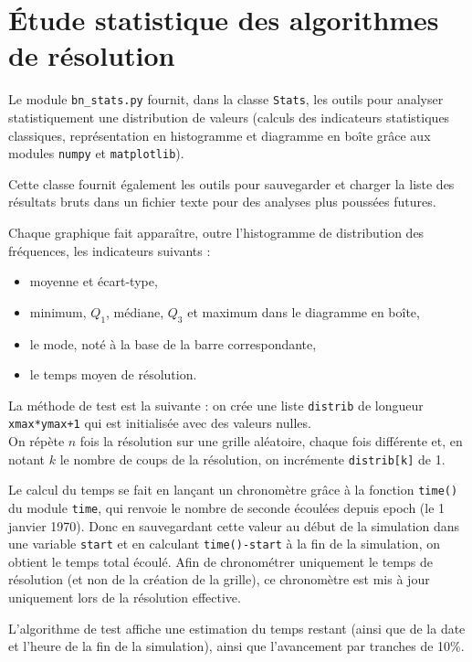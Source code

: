 \chapter{Étude statistique des algorithmes de résolution}\label{annexe_stats}
Le module \texttt{bn\_stats.py} fournit, dans la classe \texttt{Stats}, les outils pour analyser statistiquement une distribution de valeurs (calculs des indicateurs statistiques classiques, représentation en histogramme et diagramme en boîte grâce aux modules \texttt{numpy} et \texttt{matplotlib}).

Cette classe fournit également les outils pour sauvegarder et charger la liste des résultats bruts dans un fichier texte pour des analyses plus poussées futures.

Chaque graphique fait apparaître, outre l'histogramme de distribution des fréquences, les indicateurs suivants :
\begin{itemize}
\item moyenne et écart-type,
\item minimum, $Q_1$, médiane, $Q_3$ et maximum dans le diagramme en boîte,
\item le mode, noté à la base de la barre correspondante,
\item le temps moyen de résolution.
\end{itemize}

\medskip

La méthode de test est la suivante : on crée une liste \texttt{distrib} de longueur \texttt{xmax*ymax+1} qui est initialisée avec des valeurs nulles.\\
On répète $n$ fois la résolution sur une grille aléatoire, chaque fois différente et, en notant $k$ le nombre de coups de la résolution, on incrémente \texttt{distrib[k]} de 1.

\medskip

Le calcul du temps se fait en lançant un chronomètre grâce à la fonction \texttt{time()} du module \texttt{time}, qui renvoie le nombre de seconde écoulées depuis epoch (le 1 janvier 1970). Donc en sauvegardant cette valeur au début de la simulation dans une variable \texttt{start} et en calculant \texttt{time()-start} à la fin de la simulation, on obtient le temps total écoulé. Afin de chronométrer uniquement le temps de résolution (et non de la création de la grille), ce chronomètre est mis à jour uniquement lors de la résolution effective.

L'algorithme de test affiche une estimation du temps restant (ainsi que de la date et l'heure de la fin de la simulation), ainsi que l'avancement par tranches de 10\%.

